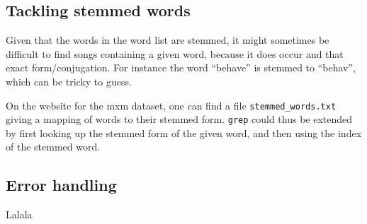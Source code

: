 \documentclass[a4paper]{article}
\begin{document}
\subsection*{Tackling stemmed words}
Given that the words in the word list are stemmed, it might sometimes be difficult to find songs containing a given word, because it does occur and that exact form/conjugation. For instance the word ``behave'' is stemmed to ``behav'', which can be tricky to guess.

On the website for the mxm dataset, one can find a file \texttt{stemmed\_words.txt} giving a mapping of words to their stemmed form. \texttt{grep} could thus be extended by first looking up the stemmed form of the given word, and then using the index of the stemmed word.

\subsection*{Error handling}

Lalala
\end{document}
